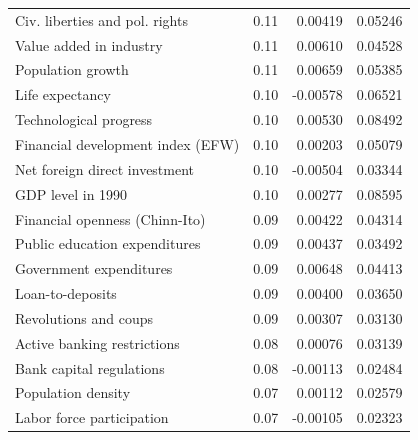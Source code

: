 \begin{refsection}
\begin{subappendices}
\begin{table}[!ht]
\begin{tabular}{lrrr}
      Civ. liberties and pol. rights & 0.11 & 0.00419 & 0.05246 \\ 
      Value added in industry & 0.11 & 0.00610 & 0.04528 \\ 
      Population growth & 0.11 & 0.00659 & 0.05385 \\ 
      Life expectancy & 0.10 & -0.00578 & 0.06521 \\ 
      Technological progress & 0.10 & 0.00530 & 0.08492 \\ 
      Financial development index (EFW) & 0.10 & 0.00203 & 0.05079 \\ 
      Net foreign direct investment & 0.10 & -0.00504 & 0.03344 \\ 
      GDP level in 1990 & 0.10 & 0.00277 & 0.08595 \\ 
      Financial openness (Chinn-Ito) & 0.09 & 0.00422 & 0.04314 \\ 
      Public education expenditures & 0.09 & 0.00437 & 0.03492 \\ 
      Government expenditures & 0.09 & 0.00648 & 0.04413 \\ 
      Loan-to-deposits & 0.09 & 0.00400 & 0.03650 \\ 
      Revolutions and coups & 0.09 & 0.00307 & 0.03130 \\ 
      Active banking restrictions & 0.08 & 0.00076 & 0.03139 \\ 
      Bank capital regulations & 0.08 & -0.00113 & 0.02484 \\ 
      Population density & 0.07 & 0.00112 & 0.02579 \\ 
      Labor force participation & 0.07 & -0.00105 & 0.02323 \\ 
      \bottomrule
    \end{tabular}
    \end{table}
    

\end{subappendices}
\end{refsection}
